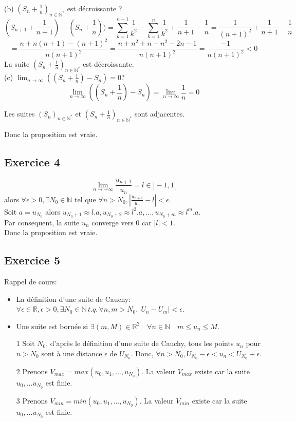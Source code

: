 \documentclass[]{book}
\theoremstyle{definition}
\newcommand{\bb}[1]{\mathbb{#1}}
\newcommand{\R}{\bb{R}}
\newcommand{\N}{\bb{N}}
\begin{document}
(b) $(S_n+\frac{1}{n})_{n \in \N^{*}}$ est d\'ecroissante ?\\
$$(S_{n+1} +\frac{1}{n+1}) - (S_{n}+\frac{1}{n})) = \sum_{k=1}^{n+1}\frac{1}{k^2} - \sum_{k=1}^{n}\frac{1}{k^2} + \frac{1}{n+1} - \frac{1}{n} = \frac{1}{(n+1)^2} + \frac{1}{n+1} - \frac{1}{n}$$  
$$= \frac{n+n(n+1)-(n+1)^2}{n(n+1)^2} = \frac{n+n^2+n-n^2-2n-1}{n(n+1)^2} = \frac{-1}{n(n+1)^2} < 0$$
La suite $(S_n+\frac{1}{n})_{n \in \N^{*}}$ est d\'ecroissante.\\

(c) $\lim_{n \to \infty}((S_n + \frac{1}{n}) - S_n) = 0 $?
$$\lim_{n \to \infty}((S_n + \frac{1}{n}) - S_n) = \lim_{n \to \infty}\frac{1}{n} = 0 $$


Les suites $(S_n)_{n \in \N^{*}}$ et $(S_n+\frac{1}{n})_{n \in \N^{*}}$ sont adjacentes.

Donc la proposition est vraie.


\subsection*{Exercice 4}
$$\lim_{n \to +\infty} \frac{u_{n+1}}{u_{n}} = l \in ]-1,1[$$ 
alors $\forall \epsilon > 0, \exists N_0 \in \mathbb{N}$ tel que $\forall n > N_{0}, |\frac{u_{n+1}}{u_{n}} - l| < \epsilon$. \\
Soit $a = u_{N_0}$ alors $u_{N_0+1} \approx l.a, u_{N_0+2} \approx {l^2.a}, \ldots , u_{N_0+m} \approx {l^{m}.a}$. \\
Par consequent, la suite $u_n$ converge vers $0$ car $|l| < 1$.
\\ 
Donc la proposition est vraie.


\subsection*{Exercice 5}
Rappel de cours:
\begin{itemize}
\item La d\'efinition d'une suite de Cauchy: $ \forall \epsilon \in \R, \epsilon> 0, \exists N_0 \in \N \, t.q.\,\forall n, m > N_0, |U_n - U_m| < \epsilon$.
\item Une suite est born\'ee si $\exists (m,M)\in \R^{2}\quad \forall n\in \N \quad m\leq u_{n}\leq M$.\\
\end{itemize}

\begin{itemize}
\item [1] Soit $N_0$, d'apr\`es le d\'efinition d'une suite de Cauchy, tous les points $u_n$ pour $n>N_0$ sont \`a une distance $\epsilon$ de $U_{N_0}$. Donc, $\forall n > N_0, U_{N_0}-\epsilon < u_n < U_{N_0}+\epsilon$. 
\item [2] Prenons $V_{max} = max(u_0, u_1, \ldots, u_{N_0})$. La valeur $V_{max}$ existe car la suite $u_0, \ldots u_{N_0}$ est finie. \\
\item [3] Prenons $V_{min} = min(u_0, u_1, \ldots, u_{N_0})$. La valeur $V_{min}$ existe car la suite $u_0, \ldots u_{N_0}$ est finie.\\
\end{itemize}
\end{document}
